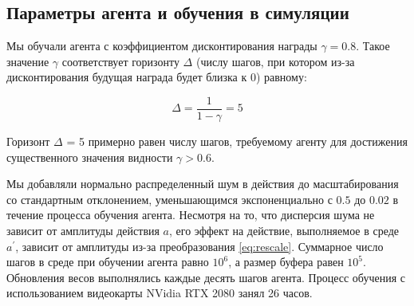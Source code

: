 \subsection{Параметры агента и обучения в симуляции}\label{sec:ch2/sec4/subsec4}

Мы обучали агента с коэффициентом дисконтирования награды $\gamma = 0.8$. Такое значение $\gamma$ соответствует горизонту $\Delta$ (числу шагов, при котором из-за дисконтирования будущая награда будет близка к $0$) равному: 

\begin{equation}
    \Delta = \frac{1}{1 - \gamma} = 5
\end{equation}

Горизонт $\Delta$ = 5 примерно равен числу шагов, требуемому агенту для достижения существенного значения видности $\gamma > 0.6$. 

Мы добавляли нормально распределенный шум в действия до масштабирования со стандартным отклонением, уменьшающимся экспоненциально с $0.5$ до $0.02$ в течение процесса обучения агента. Несмотря на то, что дисперсия шума не зависит от амплитуды действия $a$, его эффект на действие, выполняемое в среде $a^{\prime}$, зависит от амплитуды из-за преобразования \eqref{eq:rescale}. Суммарное число шагов в среде при обучении агента равно $10^6$, а размер буфера равен $10^5$. Обновления весов выполнялись каждые десять шагов агента. Процесс обучения с использованием видеокарты NVidia RTX 2080 занял 26 часов. 

